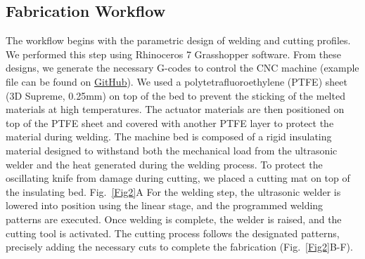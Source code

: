\documentclass[journal, letterpaper]{IEEEtran}
\begin{document}
\subsection{Fabrication Workflow}
The workflow begins with the parametric design of welding and cutting profiles. We performed this step using Rhinoceros 7 Grasshopper software. From these designs, we generate the necessary G-codes to control the CNC machine (example file can be found on \href{https://github.com/SDUSoftRobotics/Weldn-cut}{GitHub}). We used a polytetrafluoroethylene (PTFE) sheet (3D Supreme, 0.25mm) on top of the bed to prevent the sticking of the melted materials at high temperatures. The actuator materials are then positioned on top of the PTFE sheet and covered with another PTFE layer to protect the material during welding. The machine bed is composed of a rigid insulating material designed to withstand both the mechanical load from the ultrasonic welder and the heat generated during the welding process. To protect the oscillating knife from damage during cutting, we placed a cutting mat on top of the insulating bed. Fig.~\ref{Fig2}A
For the welding step, the ultrasonic welder is lowered into position using the linear stage, and the programmed welding patterns are executed. Once welding is complete, the welder is raised, and the cutting tool is activated. The cutting process follows the designated patterns, precisely adding the necessary cuts to complete the fabrication (Fig.~\ref{Fig2}B-F).
\end{document}
